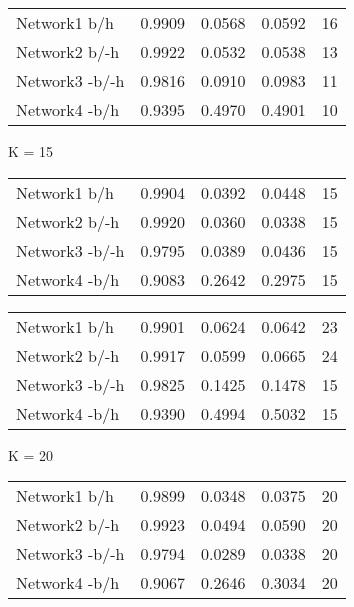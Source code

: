 \begin{table*}[h]
\begin{minipage}[h]{0.45\linewidth}
\begin{tabular}{lrrrr}
 Network1 b/h        &   0.9909 &      0.0568 &   0.0592 & 16 \\
 Network2 b/-h     &   0.9922 &      0.0532 &   0.0538 & 13 \\
 Network3 -b/-h    &   0.9816 &      0.0910 &   0.0983 & 11 \\
 Network4 -b/h      &   0.9395 &      0.4970 &   0.4901 & 10 \\
\hline
\end{tabular}
\end{minipage}


	\begin{minipage}[h]{0.45\linewidth} 
K = 15
\begin{tabular}{lrrrr}

 Network1 b/h          &   0.9904 &      0.0392 &   0.0448 & 15 \\
 Network2 b/-h       &   0.9920 &      0.0360 &   0.0338 & 15 \\
 Network3 -b/-h      &   0.9795 &      0.0389 &   0.0436 & 15 \\
 Network4 -b/h        &   0.9083 &      0.2642 &   0.2975 & 15 \\
\hline
\end{tabular}
\end{minipage}
\hspace{0.8cm}
\begin{minipage}[h]{0.45\linewidth}
\begin{tabular}{lrrrr}

 Network1 b/h        &   0.9901 &      0.0624 &   0.0642 & 23 \\
 Network2 b/-h     &   0.9917 &      0.0599 &   0.0665 & 24 \\
 Network3 -b/-h    &   0.9825 &      0.1425 &   0.1478 & 15 \\
 Network4 -b/h      &   0.9390 &      0.4994 &   0.5032 & 15 \\
\hline
\end{tabular}
\end{minipage}


	\begin{minipage}[h]{0.45\linewidth} 
K = 20
\begin{tabular}{lrrrr}

 Network1 b/h          &   0.9899 &      0.0348 &   0.0375 & 20 \\
 Network2 b/-h       &   0.9923 &      0.0494 &   0.0590 & 20 \\
 Network3 -b/-h      &   0.9794 &      0.0289 &   0.0338 & 20 \\
 Network4 -b/h        &   0.9067 &      0.2646 &   0.3034 & 20 \\
\hline
\end{tabular}
\end{minipage}
\hspace{0.8cm}
\begin{minipage}[h]{0.45\linewidth}
\begin{tabular}{lrrrr}


\end{tabular}
\end{minipage}
\end{table*}
